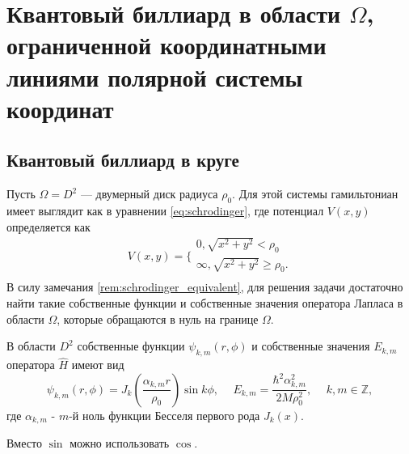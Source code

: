 \section{Квантовый биллиард в области $\Omega$, ограниченной координатными линиями полярной системы координат}\label{sec:ch1/sec2}

\subsection{Квантовый биллиард в круге}\label{sec:ch1/sec2/sub1}
Пусть $\Omega = D^2$ --- двумерный диск радиуса $\rho_0$. Для этой системы гамильтониан имеет выглядит как в уравнении \eqref{eq:schrodinger}, где 
потенциал $V(x,y)$ определяется как
\[
    V(x, y) = 
    \Bigg\{
    \begin{array}{cc}
        0, \sqrt{x^2+y^2} < \rho_0 \\
        \infty, \sqrt{x^2+y^2} \geq \rho_0. \\
    \end{array}
\] 
В силу замечания \ref{rem:schrodinger_equivalent}, для решения задачи достаточно найти такие собственные функции и собственные значения оператора Лапласа в области $\Omega$, которые обращаются в нуль на границе $\Omega$.
\begin{statement}
В области $D^2$ собственные функции $\psi_{k, m}(r, \phi)$ и собственные значения $E_{k,m}$ оператора $\hat{H}$ имеют вид 
$$\psi_{k, m}(r, \phi) = J_k\left(\frac{\alpha_{k, m}r}{\rho_0}\right)\sin{k \phi}, \hspace{15pt} E_{k,m} = \frac{\hbar^2 \alpha_{k, m}^2}{2M\rho_0^2}, \hspace{15pt} k, m \in \mathbb{Z},$$
где $\alpha_{k, m}$ - $m$-й ноль функции Бесселя первого рода $J_k(x)$.
\label{st:sec1_stat1}
\end{statement}
\begin{remark}
Вместо $\sin$ можно использовать $\cos$.
\end{remark}
